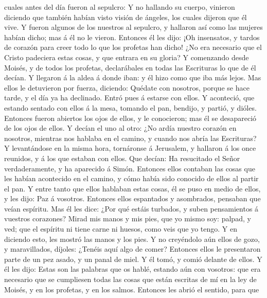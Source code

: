 cuales antes del día fueron al sepulcro:  Y no hallando su
cuerpo, vinieron diciendo que también habían visto visión de ángeles,
los cuales dijeron que él vive.  Y fueron algunos de los
nuestros al sepulcro, y hallaron así como las mujeres habían dicho; mas
á él no le vieron.  Entonces él les dijo: ¡Oh insensatos, y
tardos de corazón para creer todo lo que los profetas han dicho!
 ¿No era necesario que el Cristo padeciera estas cosas, y
que entrara en su gloria?  Y comenzando desde Moisés, y de
todos los profetas, declarábales en todas las Escrituras lo que de él
decían.  Y llegaron á la aldea á donde iban: y él hizo como
que iba más lejos.  Mas ellos le detuvieron por fuerza,
diciendo: Quédate con nosotros, porque se hace tarde, y el día ya ha
declinado. Entró pues á estarse con ellos.  Y aconteció,
que estando sentado con ellos á la mesa, tomando el pan, bendijo, y
partió, y dióles.  Entonces fueron abiertos los ojos de
ellos, y le conocieron; mas él se desapareció de los ojos de ellos.
 Y decían el uno al otro: ¿No ardía nuestro corazón en
nosotros, mientras nos hablaba en el camino, y cuando nos abría las
Escrituras?  Y levantándose en la misma hora, tornáronse á
Jerusalem, y hallaron á los once reunidos, y á los que estaban con
ellos.  Que decían: Ha resucitado el Señor verdaderamente,
y ha aparecido á Simón.  Entonces ellos contaban las cosas
que les habían acontecido en el camino, y cómo había sido conocido de
ellos al partir el pan.  Y entre tanto que ellos hablaban
estas cosas, él se puso en medio de ellos, y les dijo: Paz á vosotros.
 Entonces ellos espantados y asombrados, pensaban que veían
espíritu.  Mas él les dice: ¿Por qué estáis turbados, y
suben pensamientos á vuestros corazones?  Mirad mis manos y
mis pies, que yo mismo soy: palpad, y ved; que el espíritu ni tiene
carne ni huesos, como veis que yo tengo.  Y en diciendo
esto, les mostró las manos y los pies.  Y no creyéndolo aún
ellos de gozo, y maravillados, díjoles: ¿Tenéis aquí algo de comer?
 Entonces ellos le presentaron parte de un pez asado, y un
panal de miel.  Y él tomó, y comió delante de ellos.
 Y él les dijo: Estas son las palabras que os hablé,
estando aún con vosotros: que era necesario que se cumpliesen todas las
cosas que están escritas de mí en la ley de Moisés, y en los profetas, y
en los salmos.  Entonces les abrió el sentido, para que
